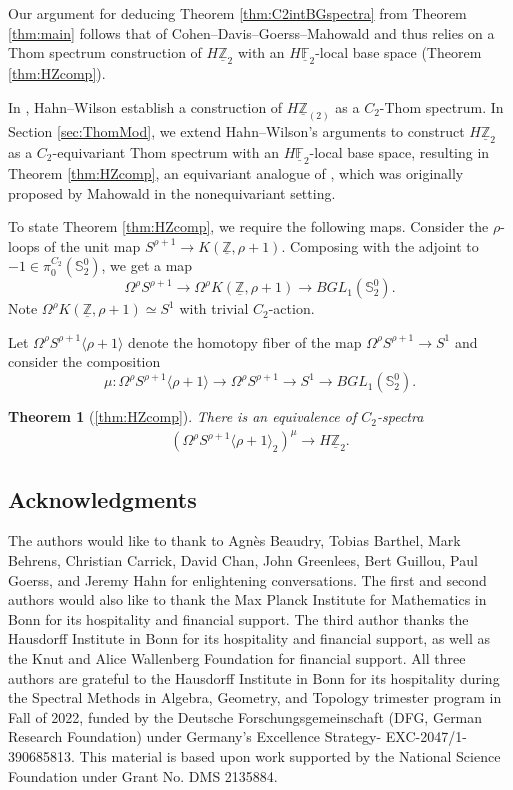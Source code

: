 \documentclass[]{amsart}  %
\newtheorem*{thm*}{Theorem}
\theoremstyle{definition}
\numberwithin{equation}{section}
\numberwithin{figure}{section}
\newcommand{\mF}{{\mathbb F}}
\newcommand{\mS}{{\mathbb S}}
\newcommand{\mZ}{{\mathbb Z}}
\newcommand{\umF}{\underline{\mF}}
\newcommand{\umZ}{\underline{\mZ}}
\newcommand{\0}{\langle 0 \rangle}
\begin{document}
Our argument for deducing Theorem \ref{thm:C2intBGspectra} from Theorem \ref{thm:main} follows that of Cohen--Davis--Goerss--Mahowald and thus relies on a Thom spectrum construction of $H \umZ_2$ with an $H \umF_2$-local base space (Theorem \ref{thm:HZcomp}).

In \cite{HW2020}, Hahn--Wilson establish a construction of $H \umZ_{(2)}$ as a $C_2$-Thom spectrum. In Section \ref{sec:ThomMod}, we extend Hahn--Wilson's arguments to construct $H \umZ_2$ as a $C_2$-equivariant Thom spectrum with an $H \umF_2$-local base space, resulting in Theorem \ref{thm:HZcomp}, an equivariant analogue of \cite[Theorem~1]{CoMayTay81}, which was originally proposed by Mahowald in the nonequivariant setting. 

To state Theorem \ref{thm:HZcomp}, we require the following maps. Consider the $\rho$-loops of the unit map $S^{\rho + 1} \to K(\umZ, \rho + 1).$ Composing with the adjoint to $-1 \in \pi_0^{C_2} (\mS_2^0)$, we get a map
    $$ \Omega^\rho S^{\rho + 1} \to \Omega^\rho K(\umZ, \rho + 1) \to BG L_1(\mS_2^0).$$
    Note $\Omega^\rho K(\umZ, \rho + 1) \simeq S^1$ with trivial $C_2$-action.

    Let $\Omega^\rho S^{\rho + 1} \langle \rho + 1 \rangle$ denote the homotopy fiber of the map $\Omega^\rho S^{\rho + 1} \to S^1$ and consider the composition 
    \[
    \mu: \Omega^\rho S^{\rho + 1} \langle \rho + 1 \rangle \to \Omega^\rho S^{\rho + 1}\to S^1 \to BGL_1(\mS_2^0). \label{eq:bundle}
    \]

    \begin{thm*}[\ref{thm:HZcomp}]
        There is an equivalence of $C_2$-spectra
    \begin{align*} 
        (\Omega^\rho S^{\rho + 1} \langle \rho + 1 \rangle_2)^\mu \to H \umZ_2. 
    \end{align*}
    \end{thm*}

\subsection*{Acknowledgments}

The authors would like to thank to Agn\`{e}s Beaudry, Tobias Barthel, Mark Behrens, Christian Carrick, David Chan, John Greenlees, Bert Guillou, Paul Goerss, and Jeremy Hahn for enlightening conversations. The first and second authors would also like to thank the Max Planck Institute for Mathematics in Bonn for its hospitality and financial support. The third author thanks the Hausdorff Institute in Bonn for its hospitality and financial support, as well as the Knut and Alice Wallenberg Foundation for financial support. All three authors are grateful to the Hausdorff Institute in Bonn for its hospitality during the Spectral Methods in Algebra, Geometry, and Topology trimester program in Fall of 2022, funded by the Deutsche Forschungsgemeinschaft (DFG, German Research Foundation) under Germany's Excellence Strategy- EXC-2047/1-390685813. This material is based upon work supported by the National Science Foundation under Grant No. DMS 2135884.
\end{document}
